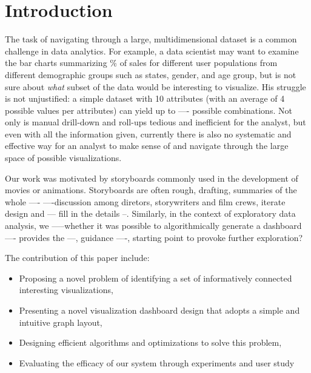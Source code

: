 \newpage
\section{Introduction}
\par The task of navigating through a large, multidimensional dataset is a common challenge in data analytics. For example, a data scientist may want to examine the bar charts summarizing \% of sales for different user populations from different demographic groups such as states, gender, and age group, but is not sure about \textit{what} subset of the data would be interesting to visualize. His struggle is not unjustified: a simple dataset with 10 attributes (with an average of 4 possible values per attributes) can yield up to ---- possible combinations. Not only is manual drill-down and roll-ups tedious and inefficient for the analyst, but even with all the information given, currently there is also no systematic and effective way for an analyst to make sense of and navigate through the large space of possible visualizations. 
\par Our work was motivated by storyboards commonly used in the development of movies or animations. Storyboards are often rough, drafting, summaries of the whole ----  ----discussion among diretors, storywriters and film crews, iterate design and --- fill in the details --. Similarly, in the context of exploratory data analysis, we -----whether it was possible to algorithmically generate a dashboard ---- provides the ---, guidance ----,  starting point to provoke further exploration?
\par 

The contribution of this paper include: 
\begin{itemize}
\item Proposing a novel problem of identifying a set of informatively connected interesting visualizations,
\item Presenting a novel visualization dashboard design that adopts a simple and intuitive graph layout,
\item Designing efficient algorithms and optimizations to solve this problem,  
\item Evaluating the efficacy of our system through experiments and user study
\end{itemize}